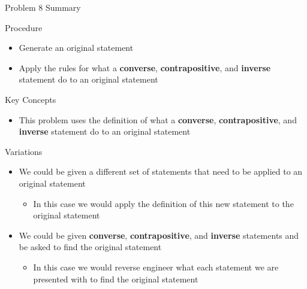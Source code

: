 \begin{summary}{Problem 8 Summary}
    \begin{statement}{Procedure}
        \begin{itemize}
            \item Generate an original statement
            \item Apply the rules for what a \textbf{converse}, \textbf{contrapositive}, and \textbf{inverse} statement do to an original statement
        \end{itemize}
    \end{statement}
    \begin{statement}{Key Concepts}
        \begin{itemize}
            \item This problem uses the definition of what a \textbf{converse}, \textbf{contrapositive}, and \textbf{inverse} statement do to an original statement
        \end{itemize}
    \end{statement}
    \begin{statement}{Variations}
        \begin{itemize}
            \item We could be given a different set of statements that need to be applied to an original statement
            \begin{itemize}
                \item In this case we would apply the definition of this new statement to the original statement
            \end{itemize}
            \item We could be given \textbf{converse}, \textbf{contrapositive}, and \textbf{inverse} statements and be asked to find the original statement
            \begin{itemize}
                \item In this case we would reverse engineer what each statement we are presented with to find the original statement
            \end{itemize}
        \end{itemize}
    \end{statement}
\end{summary}

